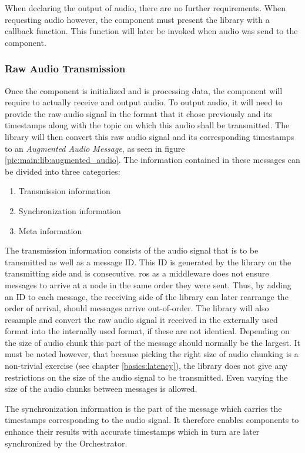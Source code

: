When declaring the output of audio, there are no further requirements.
When requesting audio however, the component must present the library with a callback function.
This function will later be invoked when audio was send to the component.

\subsubsection{Raw Audio Transmission}
\label{main:lib:augmented_audio_msg}
Once the component is initialized and is processing data, the component will require to actually receive and output audio.
To output audio, it will need to provide the raw audio signal in the format that it chose previously and its timestamps along with the topic on which this audio shall be transmitted.
The library will then convert this raw audio signal and its corresponding timestamps to an \textit{Augmented Audio Message}, as seen in figure \ref{pic:main:lib:augmented_audio}.
The information contained in these messages can be divided into three categories:
\begin{enumerate}
	\item Transmission information
	\item Synchronization information
	\item Meta information
\end{enumerate}
The transmission information consists of the audio signal that is to be transmitted as well as a message ID.
This ID is generated by the library on the transmitting side and is consecutive.
\gls{ros} as a middleware does not ensure messages to arrive at a node in the same order they were sent.
Thus, by adding an ID to each message, the receiving side of the library can later rearrange the order of arrival, should messages arrive out-of-order.
The library will also resample and convert the raw audio signal it received in the externally used format into the internally used format, if these are not identical.
Depending on the size of audio chunk this part of the message should normally be the largest.
It must be noted however, that because picking the right size of audio chunking is a non-trivial exercise (see chapter \ref{basics:latency}), the library does not give any restrictions on the size of the audio signal to be transmitted.
Even varying the size of the audio chunks between messages is allowed.  

The synchronization information is the part of the message which carries the timestamps corresponding to the audio signal.
It therefore enables components to enhance their results with accurate timestamps which in turn are later synchronized by the Orchestrator.

